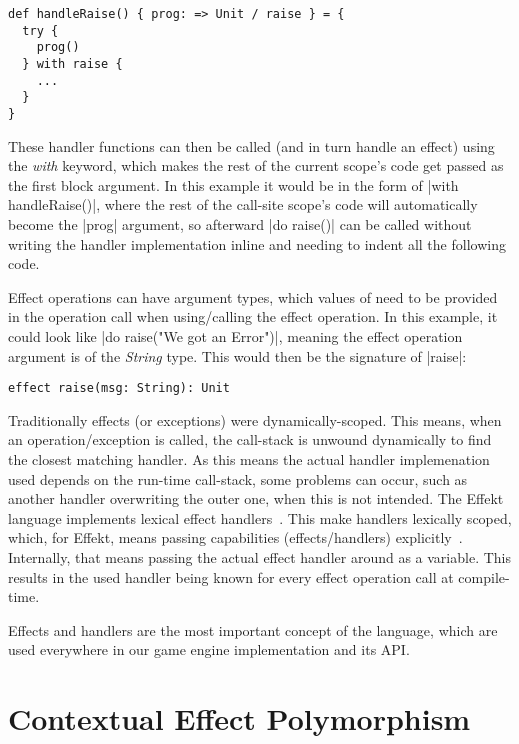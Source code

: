 \begin{lstlisting}
def handleRaise() { prog: => Unit / raise } = {
  try {
    prog()
  } with raise {
    ...
  }
}
\end{lstlisting}

These handler functions can then be called (and in turn handle an effect) using the \textit{with} keyword, which makes the rest of the current scope's code get passed as the first block argument. In this example it would be in the form of |with handleRaise()|, where the rest of the call-site scope's code will automatically become the |prog| argument, so afterward |do raise()| can be called without writing the handler implementation inline and needing to indent all the following code.

Effect operations can have argument types, which values of need to be provided in the operation call when using/calling the effect operation. In this example, it could look like |do raise("We got an Error")|, meaning the effect operation argument is of the \textit{String} type. This would then be the signature of |raise|:

\begin{lstlisting}
effect raise(msg: String): Unit
\end{lstlisting}

Traditionally effects (or exceptions) were dynamically-scoped. This means, when an operation/exception is called, the call-stack is unwound dynamically to find the closest matching handler. As this means the actual handler implemenation used depends on the run-time call-stack, some problems can occur, such as another handler overwriting the outer one, when this is not intended. The Effekt language implements lexical effect handlers~\cite{brachthauser2020effects,biernacki2019binders}. This make handlers lexically scoped, which, for Effekt, means passing capabilities (effects/handlers) explicitly~\cite{brachthauser2022effects}. Internally, that means passing the actual effect handler around as a variable. This results in the used handler being known for every effect operation call at compile-time.

Effects and handlers are the most important concept of the language, which are used everywhere in our game engine implementation and its API.

\section{Contextual Effect Polymorphism}

